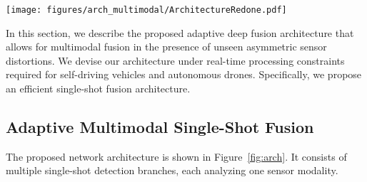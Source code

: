 \begin{figure*}[ht!]
    \centering
        \texttt{[image: figures/arch\_multimodal/ArchitectureRedone.pdf]}
	    \vspace{-0.8em}   
    \caption{Overview of our architecture consisting of four single-shot detector branches with deep feature exchange and adaptive fusion of lidar, RGB camera, gated camera, and radar. All sensory data is projected into the camera coordinate system following Sec.~\ref{sec:datarep}. To steer fusion in-between sensors, the model relies on sensor entropy, which is provided to each feature exchange block \textit{(red)}. The deep feature exchange blocks \textit{(white)}  interchange information \textit{(blue)} with parallel feature extraction blocks. The fused feature maps are analyzed by SSD blocks \textit{(orange)}.}\label{fig:arch}
     \vspace{-1.5em}   
\end{figure*}
In this section, we describe the proposed adaptive deep fusion architecture that allows for multimodal fusion in the presence of unseen asymmetric sensor distortions. We devise our architecture under real-time processing constraints required for self-driving vehicles and autonomous drones. Specifically, we propose an efficient single-shot fusion architecture.
\subsection{Adaptive Multimodal Single-Shot Fusion}
The proposed network architecture is shown in Figure~\ref{fig:arch}. It consists of multiple single-shot detection branches, each analyzing one sensor modality.

\vspace{-0.5em}
